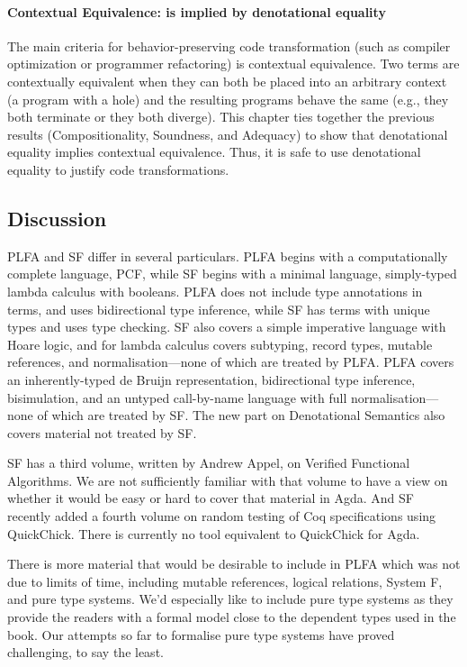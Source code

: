 \documentclass[preprint,authoryear]{elsarticle}
\begin{document}
\paragraph{Contextual Equivalence: is implied by denotational equality}
The main criteria for behavior-preserving code transformation (such as
compiler optimization or programmer refactoring) is contextual
equivalence. Two terms are contextually equivalent when they can both
be placed into an arbitrary context (a program with a hole) and the
resulting programs behave the same (e.g., they both terminate or they
both diverge). This chapter ties together the previous results
(Compositionality, Soundness, and Adequacy) to show that denotational
equality implies contextual equivalence. Thus, it is safe to use
denotational equality to justify code transformations.


\subsection*{Discussion}

PLFA and SF differ in several particulars.  PLFA begins with a computationally
complete language, PCF, while SF begins with a minimal language, simply-typed
lambda calculus with booleans.  PLFA does not include type annotations in terms,
and uses bidirectional type inference, while SF has terms with unique types and
uses type checking.  SF also covers a simple imperative language with Hoare
logic, and for lambda calculus covers subtyping, record types, mutable
references, and normalisation---none of which are treated by PLFA.  PLFA covers
an inherently-typed de Bruijn representation, bidirectional type inference,
bisimulation, and an untyped call-by-name language with full
normalisation---none of which are treated by SF.  The new part on
Denotational Semantics also covers material not treated by SF.

SF has a third volume, written by Andrew Appel, on Verified Functional
Algorithms. We are not sufficiently familiar with that volume to have a view on
whether it would be easy or hard to cover that material in Agda. And SF recently
added a fourth volume on random testing of Coq specifications using QuickChick.
There is currently no tool equivalent to QuickChick for Agda.

There is more material that would be desirable to include in PLFA which was not
due to limits of time, including mutable references, logical relations, System F, and
pure type systems. We'd especially like to include pure type systems as they
provide the readers with a formal model close to the dependent types used in the
book.  Our attempts so far to formalise pure type systems have proved
challenging, to say the least.
\end{document}
